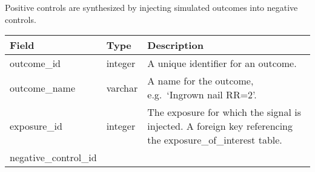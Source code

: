\documentclass[
]{article}
\begin{document}
Positive controls are synthesized by injecting simulated outcomes into
negative controls.

\begin{longtable}[]{@{}lll@{}}
\toprule
\begin{minipage}[b]{0.23\columnwidth}\raggedright
Field\strut
\end{minipage} & \begin{minipage}[b]{0.18\columnwidth}\raggedright
Type\strut
\end{minipage} & \begin{minipage}[b]{0.50\columnwidth}\raggedright
Description\strut
\end{minipage}\tabularnewline
\midrule
\endhead
\begin{minipage}[t]{0.23\columnwidth}\raggedright
outcome\_id\strut
\end{minipage} & \begin{minipage}[t]{0.18\columnwidth}\raggedright
integer\strut
\end{minipage} & \begin{minipage}[t]{0.50\columnwidth}\raggedright
A unique identifier for an outcome.\strut
\end{minipage}\tabularnewline
\begin{minipage}[t]{0.23\columnwidth}\raggedright
outcome\_name\strut
\end{minipage} & \begin{minipage}[t]{0.18\columnwidth}\raggedright
varchar\strut
\end{minipage} & \begin{minipage}[t]{0.50\columnwidth}\raggedright
A name for the outcome, e.g.~`Ingrown nail RR=2'.\strut
\end{minipage}\tabularnewline
\begin{minipage}[t]{0.23\columnwidth}\raggedright
exposure\_id\strut
\end{minipage} & \begin{minipage}[t]{0.18\columnwidth}\raggedright
integer\strut
\end{minipage} & \begin{minipage}[t]{0.50\columnwidth}\raggedright
The exposure for which the signal is injected. A foreign key referencing
the exposure\_of\_interest table.\strut
\end{minipage}\tabularnewline
\begin{minipage}[t]{0.23\columnwidth}\raggedright
negative\_control\_id\strut
\end{minipage} & \begin{minipage}[t]{0.18\columnwidth}\raggedright

\end{minipage}
\end{longtable}
\end{document}
